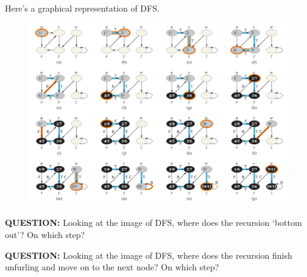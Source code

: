 \documentclass[12pt]{article}
\begin{document}
Here's a graphical representation of DFS.

\begin{figure}[h]
    \includegraphics[width=\textwidth]{dfs.png}
\end{figure}

\textbf{QUESTION:} Looking at the image of DFS, where does the recursion `bottom out'? On which step?

\textbf{QUESTION:} Looking at the image of DFS, where does the recursion finish unfurling and move on to the next node? On which step? 
\end{document}
